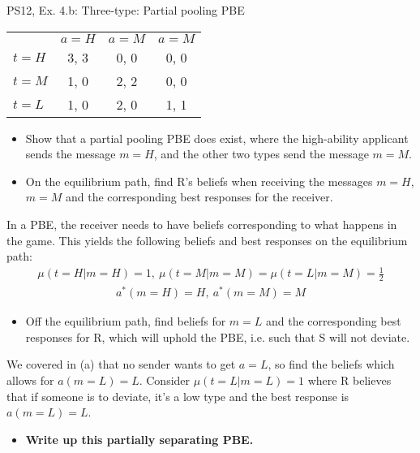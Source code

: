 \begin{frame}{PS12, Ex. 4.b: Three-type: Partial pooling PBE}
    \begin{table}
      \begin{tabular}{l|c|c|c|}
          \multicolumn{1}{c}{} & \multicolumn{1}{c}{$a=H$} & \multicolumn{1}{c}{$a=M$} & \multicolumn{1}{c}{$a=M$} \\\cline{2-4}
          $t=H$ & 3, 3 & 0, 0 & 0, 0 \\\cline{2-4}
          $t=M$ & 1, 0 & 2, 2 & 0, 0 \\\cline{2-4}
          $t=L$ & 1, 0 & 2, 0 & 1, 1 \\\cline{2-4}
      \end{tabular}
    \end{table}\vspace{-8pt}
    \begin{itemize}
      \item[(b)] Show that a partial pooling PBE does exist, where the high-ability applicant sends the message $m = H$, and the other two types send the message $m = M$.
      \item[Step 1:] On the equilibrium path, find R's beliefs when receiving the messages $m=H$, $m=M$ and the corresponding best responses for the receiver.
    \end{itemize}\vspace{-6pt}
    In a PBE, the receiver needs to have beliefs corresponding to what happens in the game. This yields the following beliefs and best responses on the equilibrium path:\vspace{-2pt}
    \begin{align*}
        \mu(t=H|m=H)=1,\
        \mu(t=M|m=M)=\mu(t=L|m=M)=\frac{1}{2}
    \end{align*}\vspace{-18pt}
    \begin{align*}
        a^*(m=H)=H,\ a^*(m=M)=M
    \end{align*}\vspace{-18pt}
    \begin{itemize}
      \item[Step 2:] Off the equilibrium path, find beliefs for $m=L$ and the corresponding best responses for R, which will uphold the PBE, i.e. such that S will not deviate.
    \end{itemize}\vspace{-6pt}
    We covered in (a) that no sender wants to get $a=L$, so find the beliefs which allows for $a(m=L)=L$. Consider $\mu(t=L|m=L)=1$ where R believes that if someone is to deviate, it's a low type and the best response is $a(m=L)=L$.\vspace{-2pt}
    \begin{itemize}
      \item[Step 3:] \textbf{Write up this partially separating PBE.}
    \end{itemize}\vspace{-10pt}
    \vfill\null
\end{frame}
